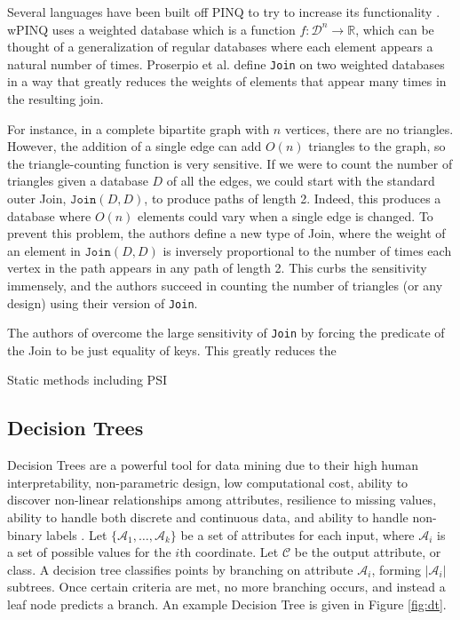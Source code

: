 \documentclass[11pt]{article}
\begin{document}
Several languages have been built off PINQ to try to increase its functionality \cite{Proserpio:2014} \cite{Johnson:2017}. wPINQ \cite{Proserpio:2014} uses a weighted database which is a function $f : \mathcal{D}^n \rightarrow \mathbb{R}$, which can be thought of a generalization of regular databases where each element appears a natural number of times. Proserpio et al. define \texttt{Join} on two weighted databases in a way that greatly reduces the weights of elements that appear many times in the resulting join.

For instance, in a complete bipartite graph with $n$ vertices, there are no triangles. However, the addition of a single edge can add $O(n)$ triangles to the graph, so the triangle-counting function is very sensitive. If we were to count the number of triangles given a database $D$ of all the edges, we could start with the standard outer Join, $\texttt{Join}(D, D)$, to produce paths of length 2. Indeed, this produces a database where $O(n)$ elements could vary when a single edge is changed. To prevent this problem, the authors define a new type of Join, where the weight of an element in $\texttt{Join}(D, D)$ is inversely proportional to the number of times each vertex in the path appears in any path of length 2. This curbs the sensitivity immensely, and the authors succeed in counting the number of triangles (or any design) using their version of \texttt{Join}.

The authors of \cite{Johnson:2017} overcome the large sensitivity of \texttt{Join} by forcing the predicate of the Join to be just equality of keys. This greatly reduces the 

Static methods including PSI

\subsection{Decision Trees}

Decision Trees are a powerful tool for data mining due to their high human interpretability, non-parametric design, low computational cost, ability to discover non-linear relationships among attributes, resilience to missing values, ability to handle both discrete and continuous data, and ability to handle non-binary labels \cite{Fletcher:2016}. Let $\{\mathcal{A}_1, \ldots, \mathcal{A}_k\}$ be a set of attributes for each input, where $\mathcal{A}_i$ is a set of possible values for the $i$th coordinate. Let $\mathcal{C}$ be the output attribute, or class. A decision tree classifies points by branching on attribute $\mathcal{A}_i$, forming $|\mathcal{A}_i|$ subtrees. Once certain criteria are met, no more branching occurs, and instead a leaf node predicts a branch. An example Decision Tree is given in Figure \ref{fig:dt}.
\end{document}
